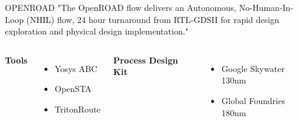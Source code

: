 \begin{frame}{OPENROAD \cite{ajayi2019openroad}}{\insertsection}
    "The OpenROAD flow delivers an Autonomous, No-Human-In-Loop (NHIL) flow, 24 hour turnaround from RTL-GDSII for rapid design exploration and physical design implementation."
    \vspace{1cm}

    \begin{columns}
        \centering
        \textbf{Tools}
        \begin{itemize}
            \item Yosys ABC
            \item OpenSTA
            \item TritonRoute
        \end{itemize}

        \centering
        \textbf{Process Design Kit}
        \begin{itemize}
            \item Google Skywater 130nm
            \item Global Foundries 180nm
        \end{itemize}
    \end{columns}
\end{frame}

